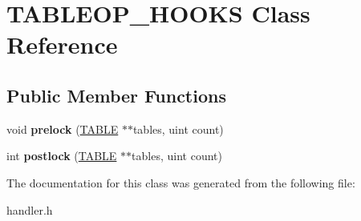 \hypertarget{classTABLEOP__HOOKS}{}\section{T\+A\+B\+L\+E\+O\+P\+\_\+\+H\+O\+O\+KS Class Reference}
\label{classTABLEOP__HOOKS}
\subsection*{Public Member Functions}
\begin{DoxyCompactItemize}
\item 
\mbox{\label{classTABLEOP__HOOKS_a185cf1a7cb8e3575714ddc59da2a178f}} 
void {\bfseries prelock} (\mbox{\hyperlink{structTABLE}{T\+A\+B\+LE}} $\ast$$\ast$tables, uint count)
\item 
\mbox{\label{classTABLEOP__HOOKS_af278ede9cbc7a58de1a211e22659036b}} 
int {\bfseries postlock} (\mbox{\hyperlink{structTABLE}{T\+A\+B\+LE}} $\ast$$\ast$tables, uint count)
\end{DoxyCompactItemize}


The documentation for this class was generated from the following file\+:\begin{DoxyCompactItemize}
\item 
handler.\+h\end{DoxyCompactItemize}
